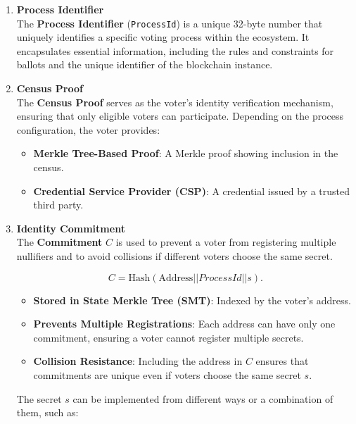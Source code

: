 \begin{enumerate}
	\item \textbf{Process Identifier} \\
	
	The \textbf{Process Identifier} (\texttt{ProcessId}) is a unique 32-byte number that uniquely identifies a specific voting process within the \davinci ecosystem. It encapsulates essential information, including the rules and constraints for ballots and the unique identifier of the \davinci blockchain instance.\\
	
	\item \textbf{Census Proof} \\
	
	The \textbf{Census Proof} serves as the voter's identity verification mechanism, ensuring that only eligible voters can participate. Depending on the process configuration, the voter provides:
	\begin{itemize}
		\item \textbf{Merkle Tree-Based Proof}: A Merkle proof showing inclusion in the census.
		\item \textbf{Credential Service Provider (CSP)}: A credential issued by a trusted third party. \\
	\end{itemize}
	
	\item \textbf{Identity Commitment}\\
	
	The \textbf{Commitment} $C$ is used to prevent a voter from registering multiple nullifiers and to avoid collisions if different voters choose the same secret.
	
	$$ C = \text{Hash} (\text{Address} || ProcessId || s). $$
	
	\begin{itemize}
		\item \textbf{Stored in State Merkle Tree (SMT)}: Indexed by the voter's address.
		\item \textbf{Prevents Multiple Registrations}: Each address can have only one commitment, ensuring a voter cannot register multiple secrets.
		\item \textbf{Collision Resistance}: Including the address in $C$ ensures that commitments are unique even if voters choose the same secret $s$.
	\end{itemize}
	
	The secret $s$ can be implemented from different ways or a combination of them, such as:
	

\end{enumerate}
